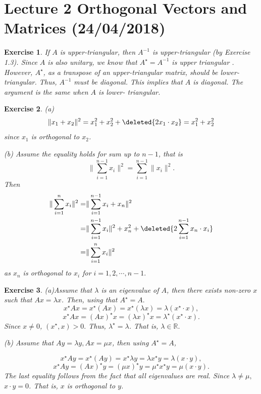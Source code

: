 \documentclass[paper=a4, fontsize=11pt]{scrartcl} %
\numberwithin{equation}{section} %
\numberwithin{figure}{section} %
\numberwithin{table}{section} %
\newtheorem{exercise}{Exercise}
\numberwithin{exercise}{section}
\begin{document}
\section{ Lecture 2  Orthogonal Vectors and Matrices (24/04/2018)}
\begin{exercise}
If $A$ is upper-triangular, then $A^{-1}$ is upper-triangular (by Exercise 1.3). Since $A$ is also unitary, we know that $A^{\star}=A^{-1}$ is upper triangular . However, $A^{\star}$,  as a transpose of an upper-triangular matrix, should be lower-triangular. Thus, $A^{-1}$ must be diagonal.  This implies that $A$ is diagonal.  The argument is the same when $A$ is lower- triangular.
\end{exercise}
\begin{exercise}
(a) $$\|x_1+x_2\|^2=x_1^2+x_2^2+\deleted{2 x_1\cdot x_2}=x_1^2+x_2^2$$
since $x_1$ is orthogonal to $x_2$.

(b) Assume the equality holds for sum up to $n-1$, that is 
$$\|\sum_{i=1}^{n-1} x_i\|^2=\sum_{i=1}^{n-1} \|x_i\|^2.$$
Then 
\begin{align*}
\|\sum_{i=1}^{n} x_i\|^2=&\|\sum_{i=1}^{n-1} x_i +x_n\|^2\\
{}=&\|\sum_{i=1}^{n-1} x_i \|^2+x_n^2+\deleted{2 \sum_{i=1}^{n-1} x_n\cdot x_i}\\
{}=&\|\sum_{i=1}^{n} x_i \|^2
\end{align*}
as $x_n$ is orthogonal to $x_i$ for $i=1,2,\cdots,n-1.$
\end{exercise}
\begin{exercise}

(a)Assume that $\lambda$ is an eigenvalue of $A$, then there exists non-zero $x$ such that $Ax=\lambda x$. Then, using that $A^{\star}=A.$
$${x^{\star} }A x={x^{\star}}(Ax)={x^{\star}}(\lambda x)=\lambda (x^{\star} \cdot x),$$
$${x^{\star}}A x=(A{x})^{\star}x=({\lambda}{x} )^{\star} x={\lambda}^{\star} ({x^\star} \cdot x).$$
 Since $x\neq 0$, $({x^{\star}},x)>0.$ Thus, ${\lambda^{\star}}=\lambda$. That is, $\lambda\in\mathbb{R}.$
 
 (b) Assume that $Ay=\lambda y, Ax=\mu x$, then using $A^\star=A$,
 
 $${x^\star} Ay={x^{\star}}(Ay)={x^\star} \lambda y=\lambda {x^\star} y=\lambda (x\cdot y),$$
  $$x^{\star} Ay= (Ax)^{\star} y=(\mu x)^{\star} y=\mu ^{\star}  x^{\star}  y =\mu  (x\cdot y).$$
 The last equality follows from the fact that all eigenvalues are real.
 Since $\lambda\neq \mu,$ $x\cdot y=0$. That is, $x$ is orthogonal to $y$.
\end{exercise}
\end{document}
